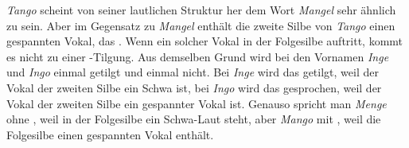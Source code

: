 \textit{Tango} scheint von seiner lautlichen Struktur her dem Wort \textit{Mangel} sehr ähnlich zu sein. Aber im Gegensatz zu \textit{Mangel} enthält die zweite Silbe von \textit{Tango} einen gespannten Vokal, das . Wenn ein solcher Vokal in der Folgesilbe auftritt, kommt es nicht zu einer -Tilgung. Aus demselben Grund wird bei den Vornamen \textit{Inge} und \textit{Ingo} einmal getilgt und einmal nicht. Bei \textit{Inge} \textipa{[PI\.*N@]} wird das  getilgt, weil der Vokal der zweiten Silbe ein Schwa ist, bei \textit{Ingo} \textipa{[PIN.go]} wird das \textipa{[g]} gesprochen, weil der Vokal der zweiten Silbe ein gespannter Vokal ist. Genauso spricht man \textit{Menge} ohne \textipa{[g]}, weil in der Folgesilbe ein Schwa-Laut steht, aber \textit{Mango} mit \textipa{[g]}, weil die Folgesilbe einen gespannten Vokal enthält. 


